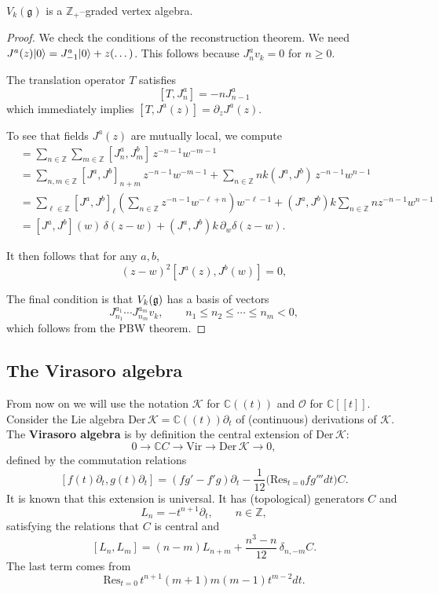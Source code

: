\documentclass[12pt]{article}
\begin{document}
\begin{theorem}
$V_k(\mathfrak{g})$ is a $\mathbb{Z}_+$–graded vertex algebra.
\end{theorem}

\begin{proof}
    We check the conditions of the reconstruction theorem. 
    We need $J^a(z)\lvert 0 \rangle = J^a_{-1}\lvert 0 \rangle + z(\dots)$. This follows because $J^a_n v_k = 0$ for $n\ge0$.

The translation operator $T$ satisfies \[[T,J^a_n] = -n J^a_{n-1}\] which immediately implies $[T,J^a(z)] = \partial_z J^a(z)$.

To see that fields $J^a(z)$ are mutually local, we compute \begin{align*}
    [J^a(z),J^b(w)]
    &= \sum_{n\in\mathbb{Z}}\sum_{m\in\mathbb{Z}} [J^a_n, J^b_m]\,z^{-n-1}w^{-m-1} \\[4pt]
    &= \sum_{n,m\in\mathbb{Z}} [J^a,J^b]_{n+m}\,z^{-n-1}w^{-m-1}
      + \sum_{n\in\mathbb{Z}} n k (J^a,J^b)\,z^{-n-1}w^{n-1} \\[4pt]
    &= \sum_{\ell\in\mathbb{Z}} [J^a,J^b]_\ell
       \left( \sum_{n\in\mathbb{Z}} z^{-n-1}w^{-\ell+n} \right) w^{-\ell-1}
       + (J^a,J^b)k \sum_{n\in\mathbb{Z}} n z^{-n-1}w^{n-1} \\[4pt]
    &= [J^a,J^b](w)\,\delta(z-w)
       + (J^a,J^b)k\,\partial_w\delta(z-w).
\end{align*}

It then follows that for any $a,b$,
\[
(z-w)^2 [J^a(z),J^b(w)] = 0,
\]

The final condition is that $V_k(\mathfrak{g})$ has a basis of vectors
\[J^{a_1}_{n_1} \cdots J^{a_m}_{n_m} v_k,\qquad n_1\le n_2 \le \cdots \le n_m < 0,\]
which follows from the PBW theorem.
\end{proof}
\subsection{The Virasoro algebra}
From now on we will use the notation $\mathcal{K}$ for $\mathbb{C}((t))$ and
$\mathcal{O}$ for $\mathbb{C}[[t]]$.
Consider the Lie algebra $\mathrm{Der}\,\mathcal{K} = \mathbb{C}((t))\partial_t$
of (continuous) derivations of $\mathcal{K}$.
The \textbf{Virasoro algebra} is by definition the central extension of
$\mathrm{Der}\,\mathcal{K}$:
\[
0 \to \mathbb{C}C \to \mathrm{Vir} \to \mathrm{Der}\,\mathcal{K} \to 0,
\]
defined by the commutation relations
\begin{equation}\label{2.5.1}
[f(t)\partial_t, g(t)\partial_t]
= (fg' - f'g)\partial_t - \frac{1}{12}\big(\mathrm{Res}_{t=0}f g'''dt\big)C.
\end{equation}
It is known that this extension is universal. It has (topological) generators
$C$ and
\[
L_n = -t^{n+1}\partial_t, \qquad n\in\mathbb{Z},
\]
satisfying the relations that $C$ is central and
\begin{equation}\label{2.5.2}
[L_n,L_m] = (n-m)L_{n+m} + \frac{n^3 - n}{12}\,\delta_{n,-m}C.
\end{equation}
The last term comes from
\[
\mathrm{Res}_{t=0}\, t^{n+1}(m+1)m(m-1)t^{m-2}dt.
\]
\end{document}
